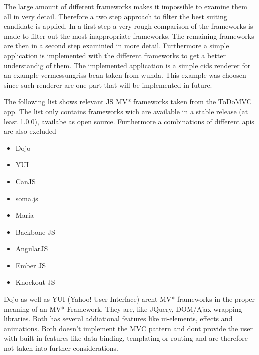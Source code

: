The large amount of different frameworks makes it impossible to examine them all in very detail. Therefore a two step approach to filter the best suiting candidate is applied. In a first step a very rough comparison of the frameworks is made to filter out the most inappropriate frameworks. The remaining frameworks are then in a second step examinied in more detail. Furthermore a simple application is implemented with the different frameworks to get a better understandig of them. The implemented application is a simple cids renderer for an example vermessungriss bean taken from wunda. This example was choosen since such renderer are one part that will be implemented in future.    

The following list shows relevant JS MV* frameworks taken from the ToDoMVC app. The list only contains frameworks wich are available in a stable release (at least 1.0.0), availabe as open source. Furthermore a combinations of different apis are also excluded 

\begin{itemize}
	\item Dojo
	\item YUI
	\item CanJS
	\item soma.js
	\item Maria
	\item Backbone JS
	\item AngularJS
	\item Ember JS
	\item Knockout JS
\end{itemize}

Dojo as well as YUI (Yahoo! User Interface) arent MV* frameworks in the proper meaning of an MV* Framework. They are, like JQuery, DOM/Ajax wrapping libraries. Both has several addiational features like ui-elements, effects and animations. Both doesn't implement the MVC pattern and dont provide the user with built in features like data binding, templating or routing and are therefore not taken into further considerations.


